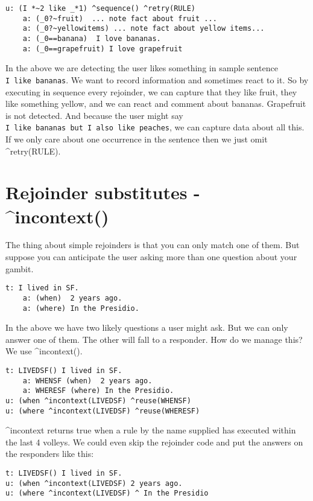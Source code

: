 \documentclass[]{article}
\begin{document}
\begin{verbatim}
u: (I *~2 like _*1) ^sequence() ^retry(RULE) 
    a: (_0?~fruit)  ... note fact about fruit ...
    a: (_0?~yellowitems) ... note fact about yellow items...
    a: (_0==banana)  I love bananas.
    a: (_0==grapefruit) I love grapefruit
\end{verbatim}

In the above we are detecting the user likes something in sample
sentence \texttt{I\ like\ bananas}. We want to record information and
sometimes react to it. So by executing in sequence every rejoinder, we
can capture that they like fruit, they like something yellow, and we can
react and comment about bananas. Grapefruit is not detected. And because
the user might say
\texttt{I\ like\ bananas\ but\ I\ also\ like\ peaches}, we can capture
data about all this. If we only care about one occurrence in the
sentence then we just omit \^{}retry(RULE).

\section{Rejoinder substitutes -
\^{}incontext()}\label{rejoinder-substitutes---incontext}

The thing about simple rejoinders is that you can only match one of
them. But suppose you can anticipate the user asking more than one
question about your gambit.

\begin{verbatim}
t: I lived in SF.
    a: (when)  2 years ago.
    a: (where) In the Presidio.
\end{verbatim}

In the above we have two likely questions a user might ask. But we can
only answer one of them. The other will fall to a responder. How do we
manage this? We use \^{}incontext().

\begin{verbatim}
t: LIVEDSF() I lived in SF.
    a: WHENSF (when)  2 years ago.
    a: WHERESF (where) In the Presidio.
u: (when ^incontext(LIVEDSF) ^reuse(WHENSF)
u: (where ^incontext(LIVEDSF) ^reuse(WHERESF)
\end{verbatim}

\^{}incontext returns true when a rule by the name supplied has executed
within the last 4 volleys. We could even skip the rejoinder code and put
the answers on the responders like this:

\begin{verbatim}
t: LIVEDSF() I lived in SF.
u: (when ^incontext(LIVEDSF) 2 years ago.
u: (where ^incontext(LIVEDSF) ^ In the Presidio 
\end{verbatim}
\end{document}
